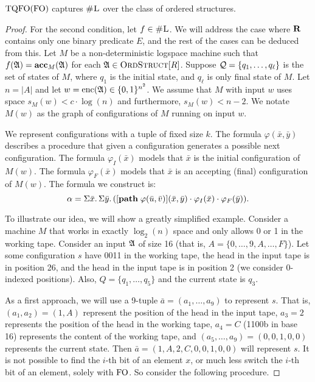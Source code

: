 \begin{theorem}
	${\rm TQFO}({\rm FO})$ captures $\text{\sc \#L}$ over the class of ordered structures.
\end{theorem}
\begin{proof}
	For the second condition, let $f \in \text{\sc \#L}$. We will address the case where $\mathbf{R}$ contains only one binary predicate $E$, and the rest of the cases can be deduced from this. Let $M$ be a non-deterministic logspace machine such that $f(\mathfrak{A}) = \textbf{acc}_M(\mathfrak{A})$ for each $\mathfrak{A} \in \text{\sc OrdStruct}[R]$. Suppose ${\cal Q} = \{q_1,\ldots,q_{\ell}\}$ is the set of states of $M$, where $q_1$ is the initial state, and $q_{\ell}$ is only final state of $M$. Let $n = \vert A \vert$ and let $w = {\rm enc}(\mathfrak{A}) \in \{0,1\}^{n^2}$. We assume that $M$ with input $w$ uses space $s_M(w) < c\cdot\log(n)$ and furthermore, $s_M(w) < n-2$. We notate $M(w)$ as the graph of configurations of $M$ running on input $w$.
	
	We represent configurations with a tuple of fixed size $k$. The formula $\varphi(\bar{x},\bar{y})$ describes a procedure that given a configuration generates a possible next configuration. The formula $\varphi_I(\bar{x})$ models that $\bar{x}$ is the initial configuration of $M(w)$. The formula $\varphi_F(\bar{x})$ models that $\bar{x}$ is an accepting (final) configuration of $M(w)$. The formula we construct is:
	$$
	\alpha = \Sigma{\bar{x}}.\,\Sigma{\bar{y}}.\,([{\bf path} \; \varphi(\bar{u},\bar{v})](\bar{x},\bar{y})\cdot \varphi_I(\bar{x})\cdot\varphi_F(\bar{y})).
	$$
	
	To illustrate our idea, we will show a greatly simplified example. Consider a machine $M$ that works in exactly $\log_2(n)$ space and only allows 0 or 1 in the working tape. Consider an input $\mathfrak{A}$ of size 16 (that is, $A = \{0,\ldots,9,A,\ldots,F\}$). Let some configuration $s$ have 0011 in the working tape, the head in the input tape is in position 26, and the head in the input tape is in position 2 (we consider 0-indexed positions). Also, $Q = \{q_1,\ldots,q_5\}$ and the current state is $q_3$.
	
	As a first approach, we will use a 9-tuple $\bar{a} = (a_1,\ldots,a_9)$ to represent $s$. That is, $(a_1,a_2) = (1,A)$ represent the position of the head in the input tape, $a_3 = 2$ represents the position of the head in the working tape, $a_4 = C$ (1100b in base 16) represents the content of the working tape, and $(a_5,\ldots,a_9) = (0,0,1,0,0)$ represents the current state. Then $\bar{a} = (1,A,2,C,0,0,1,0,0)$ will represent $s$. It is not possible  to find the $i$-th bit of an element $x$, or much less switch the $i$-th bit of an element, solely with ${\rm FO}$. So consider the following procedure.
	

\end{proof}
